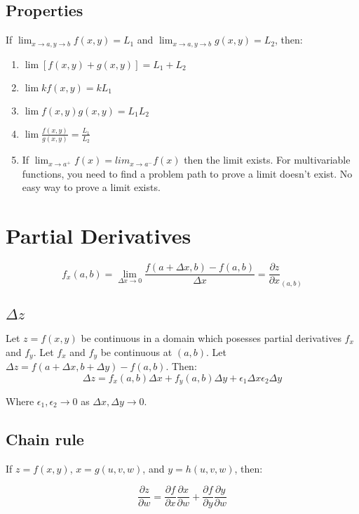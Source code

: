 \documentclass{article}
\begin{document}
\subsection{Properties}
If $\lim_{x \to a, y \to b} f(x,y)= L_1$ and
$\lim_{x \to a, y \to b} g(x,y) = L_2$, then:
\begin{enumerate}
  \item $\lim[f(x,y)+g(x,y)] = L_1 + L_2$
  \item $\lim kf(x,y) = kL_1$
  \item $\lim f(x,y)g(x,y) = L_1L_2$
  \item $\lim \frac{f(x,y)}{g(x,y)} = \frac{L_1}{L_2}$
  \item If $\lim_{x \to a^+} f(x) = lim_{x \to a^-} f(x)$ then the limit
    exists. For multivariable functions, you need to find a problem path to
    prove a limit doesn't exist. No easy way to prove a limit exists.
\end{enumerate}

\section{Partial Derivatives}
\begin{equation}
  f_x(a,b) = \lim_{\Delta x \to 0} \frac{f(a+\Delta x, b) - f(a,b)}{\Delta x} =
  \frac{\partial z}{\partial x}_{(a,b)}
\end{equation}

\subsection{$\Delta z$}
Let $z=f(x,y)$ be continuous in a domain which posesses partial derivatives
$f_x$ and $f_y$. Let $f_x$ and $f_y$ be continuous at $(a,b)$. Let
$\Delta z = f(a+\Delta x, b+ \Delta y) - f(a,b)$. Then:
\begin{equation}
  \Delta z = f_x(a,b) \Delta x + f_y(a,b)\Delta y +
  \epsilon_1 \Delta x \epsilon_2 \Delta y
\end{equation}

Where $\epsilon_1, \epsilon_2 \to 0$ as $\Delta x, \Delta y \to 0$.

\subsection{Chain rule}
If $z=f(x,y)$, $x = g(u,v,w)$, and $y=h(u,v,w)$, then:

\begin{equation}
  \frac{\partial z}{\partial w} = \frac{\partial f}{\partial x}
  \frac{\partial x}{\partial w} + \frac{\partial f}{\partial y}
  \frac{\partial y}{\partial w}
\end{equation}
\end{document}
